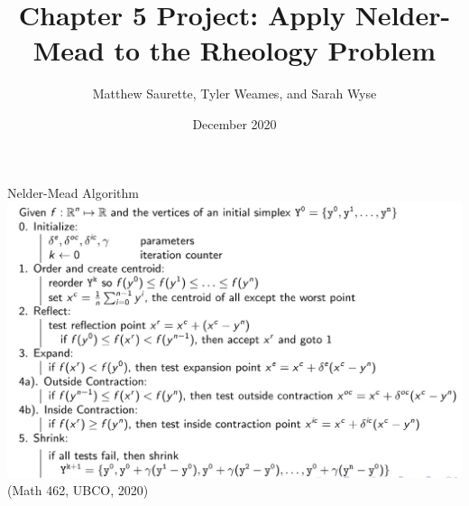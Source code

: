 \documentclass{beamer}
\title[Nelder-Mead on the Rheology Problem]{Chapter 5 Project: Apply Nelder-Mead to the Rheology Problem}
\author[Matthew, Tyler, and Sarah]{Matthew Saurette, Tyler Weames, and Sarah Wyse}
\institute[Math 462]{Math 462\\ University of British Columbia - Okanagan}
\date{December 2020}
\begin{document}
\maketitle

\begin{frame}{Nelder-Mead Algorithm}
    \centering
    \includegraphics[width=0.95\linewidth]{NMAlgorithm}\\
	\hfill \tiny (Math 462, UBCO, 2020) 
\end{frame}

\begin{frame}
\begin{figure}
\end{figure}
\end{frame}
\end{document}
